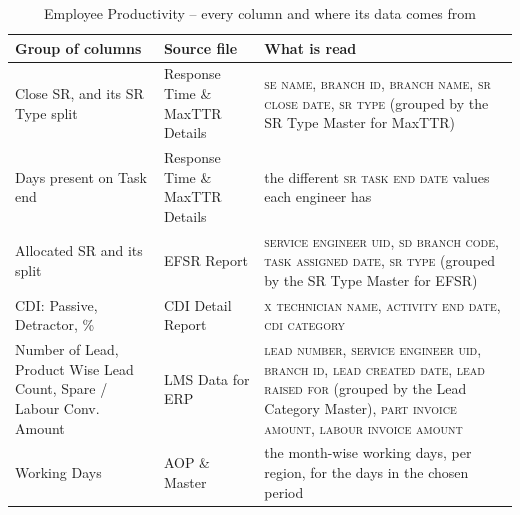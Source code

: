 \documentclass[11pt,a4paper]{article}
\newcommand{\col}[1]{\textsc{\small #1}}
\begin{document}
\begin{table}[H]\centering\small
\begin{tabularx}{\linewidth}{@{}p{3.1cm}p{4.3cm}X@{}}
\toprule
\textbf{Group of columns} & \textbf{Source file} & \textbf{What is read} \\
\midrule
Close SR, and its SR Type split &
Response Time \& MaxTTR Details &
\col{se name}, \col{branch id}, \col{branch name}, \col{sr close date}, \col{sr type}
(grouped by the SR Type Master for MaxTTR) \\
\addlinespace
Days present on Task end &
Response Time \& MaxTTR Details &
the different \col{sr task end date} values each engineer has \\
\addlinespace
Allocated SR and its split &
EFSR Report &
\col{service engineer uid}, \col{sd branch code}, \col{task assigned date},
\col{sr type} (grouped by the SR Type Master for EFSR) \\
\addlinespace
CDI: Passive, Detractor, \% &
CDI Detail Report &
\col{x technician name}, \col{activity end date}, \col{cdi category} \\
\addlinespace
Number of Lead, Product Wise Lead Count, Spare / Labour Conv. Amount &
LMS Data for ERP &
\col{lead number}, \col{service engineer uid}, \col{branch id},
\col{lead created date}, \col{lead raised for} (grouped by the Lead Category Master),
\col{part invoice amount}, \col{labour invoice amount} \\
\addlinespace
Working Days &
AOP \& Master &
the month-wise working days, per region, for the days in the chosen period \\
\bottomrule
\end{tabularx}
\caption{Employee Productivity -- every column and where its data comes from}
\end{table}
\end{document}

